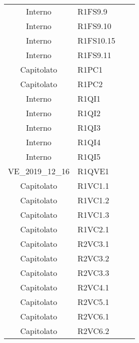 {\begin{longtable}{ c C{4cm} c c}
Interno & R1FS9.9\\

Interno & R1FS9.10\\

Interno & R1FS10.15\\

Interno & R1FS9.11\\


Capitolato & R1PC1\\

Capitolato & R1PC2\\


Interno & R1QI1\\

Interno & R1QI2\\

Interno & R1QI3\\

Interno & R1QI4\\

Interno & R1QI5\\

VE\_2019\_12\_16 & R1QVE1\\


Capitolato & R1VC1.1\\

Capitolato & R1VC1.2\\

Capitolato & R1VC1.3\\

Capitolato & R1VC2.1\\

Capitolato & R2VC3.1\\

Capitolato & R2VC3.2\\

Capitolato & R2VC3.3\\

Capitolato & R2VC4.1\\

Capitolato & R2VC5.1\\


Capitolato & R2VC6.1\\

Capitolato & R2VC6.2\\


\end{longtable}}
